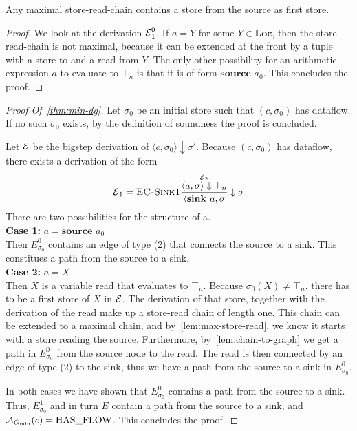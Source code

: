 \begin{lemma}
    \label{lem:max-store-read}
    Any maximal store-read-chain contains a store from the source as first store.
\end{lemma}
\begin{proof}
    We look at the derivation $\operatorname{\mathcal{E}}^0_1$.
    If $a = Y$ for some $Y \in \textbf{Loc}$, then the store-read-chain is not 
    maximal, because it can be extended at the front by a tuple with a store to and a
    read from $Y$.
    The only other possibility for an arithmetic expression $a$ to evaluate to 
    $\top_n$ is that it is of form $\textbf{source } a_0$.
    This concludes the proof.
\end{proof}


\begin{proof}[Proof Of~\autoref{thm:min-dg}]
    Let $\sigma_0$ be an initial store such that $(c, \sigma_0)$ has dataflow.
    If no such $\sigma_0$ exists, by the definition of soundness
    the proof is concluded.

    Let $\operatorname{\mathcal{E}}$ be the bigstep derivation of
    $\langle c, \sigma_0 \rangle \downarrow \sigma'$.
    Because $(c, \sigma_0)$ has dataflow, there exists a derivation of the form 
    \begin{equation*}
        \operatorname{\mathcal{E}}_1 = \textsc{EC-Sink1}\frac{\displaystyle \overset{\operatorname{\mathcal{E}}_2}{\langle a, \sigma \rangle \downarrow \top_n}}{\displaystyle \langle \textbf{sink } a, \sigma} \downarrow \sigma
    \end{equation*}
    There are two possibilities for the structure of a.\\
    \textbf{Case 1:} $a = \textbf{source }a_0$\\
    Then $E^0_{\sigma_0}$ contains an edge of type (2) that connects the source 
    to a sink. This constitues a path from the source to a sink.\\
    \textbf{Case 2:} $a = X$\\
    Then $X$ is a variable read that evaluates to $\top_n$.
    Because $\sigma_0(X) \neq \top_n$, there has to be a first store
    of $X$ in $\operatorname{\mathcal{E}}$.
    The derivation of that store, together with the derivation of the read make 
    up a store-read chain of length one.
    This chain can be extended to a maximal chain, and 
    by~\autoref{lem:max-store-read}, we know it starts with a store reading the
    source.
    Furthermore, by~\autoref{lem:chain-to-graph} we get a path in $E^0_{\sigma_0}$
    from the source node to the read. The read is then connected by an edge
    of type (2) to the sink, thus we have a path from the source to a sink in 
    $E^0_{\sigma_0}$.

    In both cases we have shown that $E^0_{\sigma_0}$ contains a path from the 
    source to a sink. Thus, $E^1_{\sigma_0}$ and in turn $E$ contain a path
    from the source to a sink, and $\operatorname{\mathcal{A}}_{G_\text{min}}(c) = \text{HAS\_FLOW}$.
    This concludes the proof.
\end{proof}

